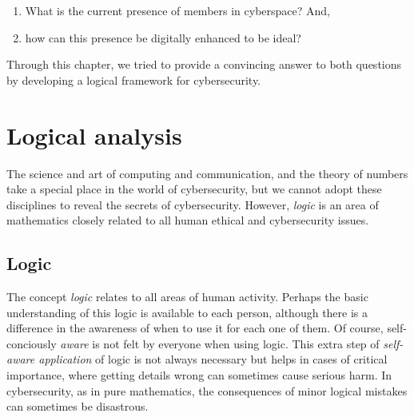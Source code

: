 \begin{enumerate}
\item What is the current presence of members in cyberspace? And,
\item how can this presence be digitally enhanced to be ideal?
\end{enumerate}

Through this chapter, we tried to provide a convincing answer to both
questions by developing a  logical framework for cybersecurity. 
\fi



\section{Logical analysis}

The science and art of computing and communication, and   the theory of numbers take a special place in the world of cybersecurity, but we cannot adopt these disciplines to reveal the secrets of cybersecurity. However, {\em logic} is an area of mathematics closely related to all human ethical and cybersecurity issues.

\subsection{Logic}\label{logicsec}

The concept {\em logic} relates to all areas of human activity. Perhaps the basic understanding of this logic is available to each person, although there is a difference in the awareness of when to use it for each one of them. Of course, self-conciously {\em aware} is not felt by everyone when using logic.
\iffalse
This extra step of {\em self-aware application} of logic is not always necessary but helps in cases of critical importance, where getting details wrong can sometimes cause serious harm. In cybersecurity, as in pure mathematics, the consequences of minor logical mistakes can sometimes be disastrous. 

